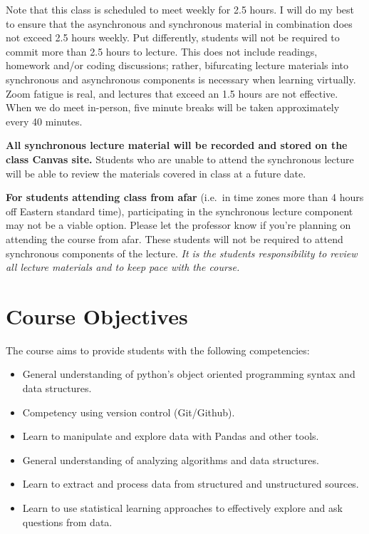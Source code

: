 \documentclass[
  12pt,
]{article}
\begin{document}
Note that this class is scheduled to meet weekly for 2.5 hours. I will
do my best to ensure that the asynchronous and synchronous material in
combination does not exceed 2.5 hours weekly. Put differently, students
will not be required to commit more than 2.5 hours to lecture. This does
not include readings, homework and/or coding discussions; rather,
bifurcating lecture materials into synchronous and asynchronous
components is necessary when learning virtually. Zoom fatigue is real,
and lectures that exceed an 1.5 hours are not effective. When we do meet
in-person, five minute breaks will be taken approximately every 40
minutes.

\textbf{All synchronous lecture material will be recorded and stored on
the class Canvas site.} Students who are unable to attend the
synchronous lecture will be able to review the materials covered in
class at a future date.

\textbf{For students attending class from afar} (i.e.~in time zones more
than 4 hours off Eastern standard time), participating in the
synchronous lecture component may not be a viable option. Please let the
professor know if you're planning on attending the course from afar.
These students will not be required to attend synchronous components of
the lecture. \emph{It is the students responsibility to review all
lecture materials and to keep pace with the course.}

\hypertarget{course-objectives}{%
\section{Course Objectives}\label{course-objectives}}

The course aims to provide students with the following competencies:

\begin{itemize}
\item
  General understanding of python's object oriented programming syntax
  and data structures.
\item
  Competency using version control (Git/Github).
\item
  Learn to manipulate and explore data with Pandas and other tools.
\item
  General understanding of analyzing algorithms and data structures.
\item
  Learn to extract and process data from structured and unstructured
  sources.
\item
  Learn to use statistical learning approaches to effectively explore
  and ask questions from data.
\end{itemize}
\end{document}
